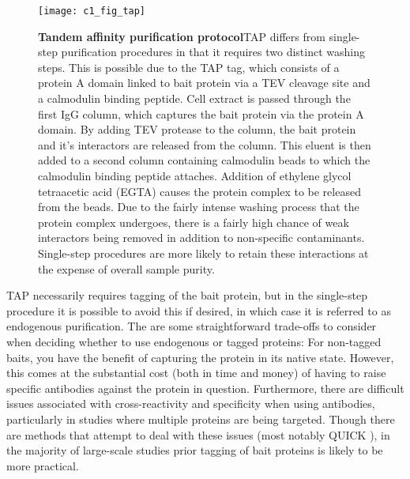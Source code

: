 \documentclass[a4paper,11pt,twoside,openright]{scrbook}
\begin{document}
\begin{figure}[h]
\fcapsideright
    {\caption[Tandem affinity purification protocol]{\sffamily\textbf{Tandem affinity \newline purification protocol}\newline \small TAP differs from single-step purification procedures in that it requires two distinct washing steps. This is possible due to the TAP tag, which consists of a protein A domain linked to bait protein via a TEV cleavage site and a calmodulin binding peptide. Cell extract is passed through the first IgG column, which captures the bait protein via the protein A domain. By adding TEV protease to the column, the bait protein and it's interactors are released from the column. This eluent is then added to a second column containing calmodulin beads to which the calmodulin  binding peptide attaches. Addition of ethylene glycol tetraacetic acid (EGTA) causes the protein complex to be released from the beads. Due to the fairly intense washing process that the protein complex undergoes, there is a fairly high chance of weak interactors being removed in addition to non-specific contaminants. Single-step procedures are more likely to retain these interactions at the expense of overall sample purity.}\label{figure:tap}}
    {\texttt{[image: c1\_fig\_tap]}}
\end{figure}

TAP necessarily requires tagging of the bait protein, but in the single-step procedure it is possible to avoid this if desired, in which case it is referred to as endogenous purification. The are some straightforward trade-offs to consider when deciding whether to use endogenous or tagged proteins: For non-tagged baits, you have the benefit of capturing the protein in its native state. However, this comes at the substantial cost (both in time and money) of having to raise specific antibodies against the protein in question. Furthermore, there are difficult issues associated with cross-reactivity and specificity when using antibodies, particularly in studies where multiple proteins are being targeted. Though there are methods that attempt to deal with these issues (most notably QUICK \cite{Selbach2006}), in the majority of large-scale studies prior tagging of bait proteins is likely to be more practical.
\end{document}

